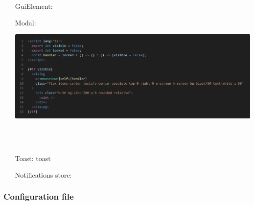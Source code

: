 \documentclass{article}
\begin{document}
\begin{itemize}
    \item[GuiElement:]
    \item[Modal:] 

    \begin{minipage}{\linewidth}
        \centering
        \includegraphics[width=1\textwidth]{modal.png}
    \end{minipage}\\\\
    
    \item[Toast:] toast
    \item[Notifications store:] 
\end{itemize}


\subsubsection{Configuration file}
\end{document}
